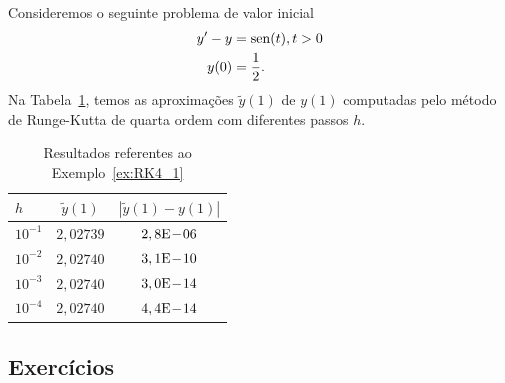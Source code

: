 \begin{ex}\label{ex:RK4_1}
  Consideremos o seguinte problema de valor inicial
  \begin{align}
    y' - y &= \operatorname{sen}(t), t>0\\
    y(0) &= \frac{1}{2}.
  \end{align}
  Na Tabela~\ref{tab:ex_RK4_1}, temos as aproximações $\tilde{y}(1)$ de $y(1)$ computadas pelo método de Runge-Kutta de quarta ordem com diferentes passos $h$.
 
  \begin{table}[h!]
    \centering
    \begin{tabular}{l|cc}
      $h$ & $\tilde{y}(1)$ & $|\tilde{y}(1)-y(1)|$\\\hline
      $10^{-1}$ & $2,02739$ & $2,8\mathrm{E}\!-\!06$ \\
      $10^{-2}$ & $2,02740$ & $3,1\mathrm{E}\!-\!10$ \\
      $10^{-3}$ & $2,02740$ & $3,0\mathrm{E}\!-\!14$ \\
      $10^{-4}$ & $2,02740$ & $4,4\mathrm{E}\!-\!14$ \\\hline
    \end{tabular}
    \caption{Resultados referentes ao Exemplo~\ref{ex:RK4_1}}
    \label{tab:ex_RK4_1}
  \end{table}





\end{ex}

\subsection*{Exercícios}

